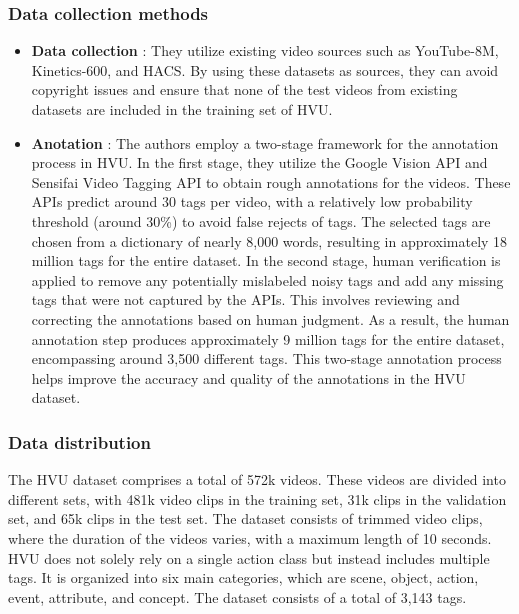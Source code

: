 \documentclass[10pt,onecolumn,letterpaper]{article}
\begin{document}
\subsubsection{Data collection methods}

\begin{itemize}

	\item \textbf{Data collection} : They utilize existing video sources such as YouTube-8M, Kinetics-600, and HACS. By using these datasets as sources, they can avoid copyright issues and ensure that none of the test videos from existing datasets are included in the training set of HVU. 

	\item\textbf{Anotation} : The authors employ a two-stage framework for the annotation process in HVU. In the first stage, they utilize the Google Vision API and Sensifai Video Tagging API to obtain rough annotations for the videos. These APIs predict around 30 tags per video, with a relatively low probability threshold (around 30\%) to avoid false rejects of tags. The selected tags are chosen from a dictionary of nearly 8,000 words, resulting in approximately 18 million tags for the entire dataset. In the second stage, human verification is applied to remove any potentially mislabeled noisy tags and add any missing tags that were not captured by the APIs. This involves reviewing and correcting the annotations based on human judgment. As a result, the human annotation step produces approximately 9 million tags for the entire dataset, encompassing around 3,500 different tags. This two-stage annotation process helps improve the accuracy and quality of the annotations in the HVU dataset.
\end{itemize}

\subsubsection{Data distribution}

The HVU dataset comprises a total of 572k videos. These videos are divided into different sets, with 481k video clips in the training set, 31k clips in the validation set, and 65k clips in the test set. The dataset consists of trimmed video clips, where the duration of the videos varies, with a maximum length of 10 seconds. HVU does not solely rely on a single action class but instead includes multiple tags. It is organized into six main categories, which are scene, object, action, event, attribute, and concept. The dataset consists of a total of 3,143 tags.
\end{document}
